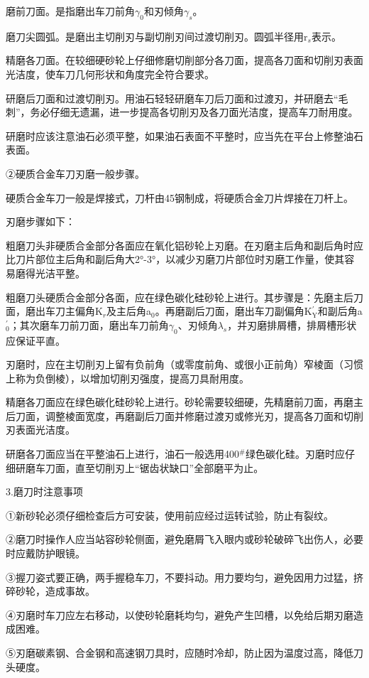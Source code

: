\documentclass{ctexbook}
\begin{document}
磨前刀面。是指磨出车刀前角$\gamma_{0}$和刃倾角$\gamma_{s}$。

磨刀尖圆弧。是磨出主切削刃与副切削刃间过渡切削刃。圆弧半径用r$_{s}$表示。

精磨各刀面。在较细硬砂轮上仔细修磨切削部分各刀面，提高各刀面和切削刃表面光洁度，使车刀几何形状和角度完全符合要求。

研磨后刀面和过渡切削刃。用油石轻轻研磨车刀后刀面和过渡刃，并研磨去“毛刺”，务必仔细无遗漏，进一步提高各切削刃及各刀面光洁度，提高车刀耐用度。

研磨时应该注意油石必须平整，如果油石表面不平整时，应当先在平台上修整油石表面。

②硬质合金车刀刃磨一般步骤。

硬质合金车刀一般是焊接式，刀杆由45钢制成，将硬质合金刀片焊接在刀杆上。

刃磨步骤如下：

粗磨刀头非硬质合金部分各面应在氧化铝砂轮上刃磨。在刃磨主后角和副后角时应比刀片部位主后角和副后角大2°-3°，以减少刃磨刀片部位时刃磨工作量，使其容易磨得光洁平整。

粗磨刀头硬质合金部分各面，应在绿色碳化硅砂轮上进行。其步骤是：先磨主后刀面，磨出车刀主偏角K$_{r}$及主后角a$_{0}$。再磨副后刀面，磨出车刀副偏角K$^{\prime}_{\text{Y}}$和副后角a$^{\prime}_{0}$；其次磨车刀前刀面，磨出车刀前角$\gamma_{0}$、刃倾角$\lambda_{s}$，并刃磨排屑槽，排屑槽形状应保证平直。

刃磨时，应在主切削刃上留有负前角（或零度前角、或很小正前角）窄棱面（习惯上称为负倒棱），以增加切削刃强度，提高刀具耐用度。

精磨各刀面应在绿色碳化硅砂轮上进行。砂轮需要较细硬，先精磨前刀面，再磨主后刀面，调整棱面宽度，再磨副后刀面并修磨过渡刃或修光刃，提高各刀面和切削刃表面光洁度。

研磨各刀面应当在平整油石上进行，油石一般选用400$^{\#}$绿色碳化硅。刃磨时应仔细研磨车刀面，直至切削刃上“锯齿状缺口”全部磨平为止。

3.磨刀时注意事项

①新砂轮必须仔细检查后方可安装，使用前应经过运转试验，防止有裂纹。

②磨刀时操作人应当站容砂轮侧面，避免磨屑飞入眼内或砂轮破碎飞出伤人，必要时应戴防护眼镜。

③握刀姿式要正确，两手握稳车刀，不要抖动。用力要均匀，避免因用力过猛，挤碎砂轮，造成事故。

④刃磨时车刀应左右移动，以使砂轮磨耗均匀，避免产生凹槽，以免给后期刃磨造成困难。

⑤刃磨碳素钢、合金钢和高速钢刀具时，应随时冷却，防止因为温度过高，降低刀头硬度。
\end{document}

